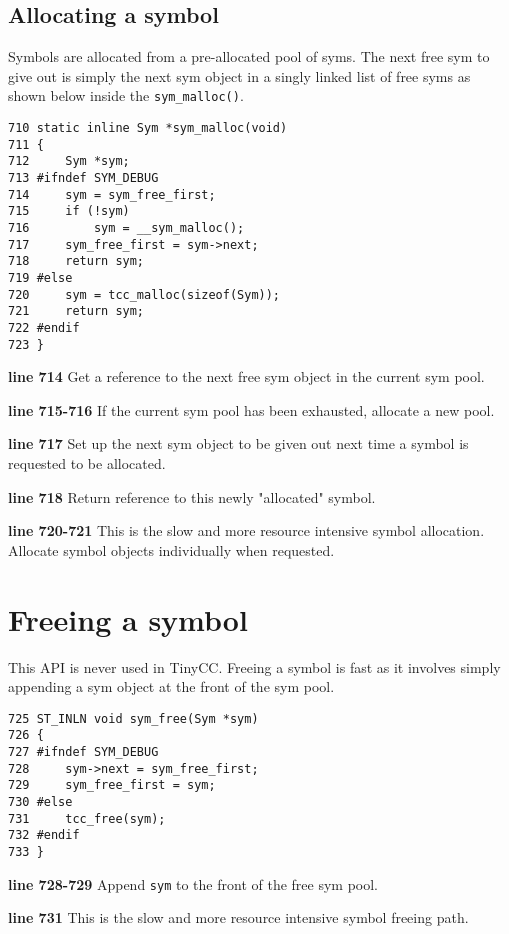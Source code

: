 \subsection{Allocating a symbol}
Symbols are allocated from a pre-allocated pool of syms. The next free sym to give out is simply the next sym object in a singly linked list of free syms as shown below inside the \verb|sym_malloc()|.

\begin{verbatim}
710 static inline Sym *sym_malloc(void)
711 {
712     Sym *sym;
713 #ifndef SYM_DEBUG
714     sym = sym_free_first;
715     if (!sym)
716         sym = __sym_malloc();
717     sym_free_first = sym->next;
718     return sym;
719 #else
720     sym = tcc_malloc(sizeof(Sym));
721     return sym;
722 #endif
723 }
\end{verbatim}
\begin{tcc_desc}
\textbf{line 714} Get a reference to the next free sym object in the current sym pool.

\textbf{line 715-716} If the current sym pool has been exhausted, allocate a new pool.

\textbf{line 717} Set up the next sym object to be given out next time a symbol is requested to be allocated.

\textbf{line 718} Return reference to this newly "allocated" symbol.

\textbf{line 720-721} This is the slow and more resource intensive symbol allocation. Allocate symbol objects individually when requested.
\end{tcc_desc}

\section{Freeing a symbol}
This API is never used in TinyCC. Freeing a symbol is fast as it involves simply appending a sym object at the front of the sym pool. 

\begin{verbatim}
725 ST_INLN void sym_free(Sym *sym)
726 {
727 #ifndef SYM_DEBUG
728     sym->next = sym_free_first;
729     sym_free_first = sym;
730 #else
731     tcc_free(sym);
732 #endif
733 }
\end{verbatim}

\begin{tcc_desc}
\textbf{line 728-729} Append \verb|sym| to the front of the free sym pool.

\textbf{line 731} This is the slow and more resource intensive symbol freeing path.
\end{tcc_desc}

